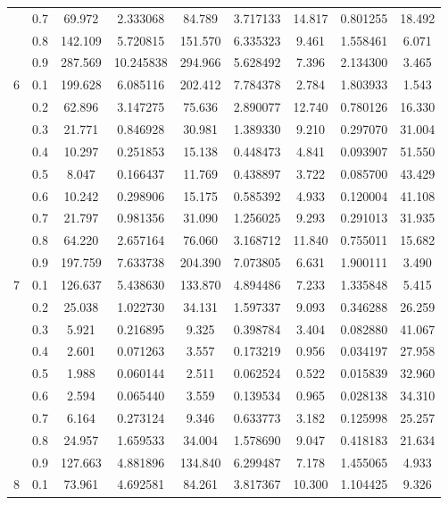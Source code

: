 \begin{longtable}{ | c | c || c | c | c | c | c | c | c | }
 & 0.7 & 69.972 & 2.333068 & 84.789 & 3.717133 & 14.817 & 0.801255 & 18.492 \\
 & 0.8 & 142.109 & 5.720815 & 151.570 & 6.335323 & 9.461 & 1.558461 & 6.071 \\
 & 0.9 & 287.569 & 10.245838 & 294.966 & 5.628492 & 7.396 & 2.134300 & 3.465 \\
 \hline
\multirow{9}{*}{6} & 0.1 & 199.628 & 6.085116 & 202.412 & 7.784378 & 2.784 & 1.803933 & 1.543 \\
 & 0.2 & 62.896 & 3.147275 & 75.636 & 2.890077 & 12.740 & 0.780126 & 16.330 \\
 & 0.3 & 21.771 & 0.846928 & 30.981 & 1.389330 & 9.210 & 0.297070 & 31.004 \\
 & 0.4 & 10.297 & 0.251853 & 15.138 & 0.448473 & 4.841 & 0.093907 & 51.550 \\
 & 0.5 & 8.047 & 0.166437 & 11.769 & 0.438897 & 3.722 & 0.085700 & 43.429 \\
 & 0.6 & 10.242 & 0.298906 & 15.175 & 0.585392 & 4.933 & 0.120004 & 41.108 \\
 & 0.7 & 21.797 & 0.981356 & 31.090 & 1.256025 & 9.293 & 0.291013 & 31.935 \\
 & 0.8 & 64.220 & 2.657164 & 76.060 & 3.168712 & 11.840 & 0.755011 & 15.682 \\
 & 0.9 & 197.759 & 7.633738 & 204.390 & 7.073805 & 6.631 & 1.900111 & 3.490 \\
 \hline
\multirow{9}{*}{7} & 0.1 & 126.637 & 5.438630 & 133.870 & 4.894486 & 7.233 & 1.335848 & 5.415 \\
 & 0.2 & 25.038 & 1.022730 & 34.131 & 1.597337 & 9.093 & 0.346288 & 26.259 \\
 & 0.3 & 5.921 & 0.216895 & 9.325 & 0.398784 & 3.404 & 0.082880 & 41.067 \\
 & 0.4 & 2.601 & 0.071263 & 3.557 & 0.173219 & 0.956 & 0.034197 & 27.958 \\
 & 0.5 & 1.988 & 0.060144 & 2.511 & 0.062524 & 0.522 & 0.015839 & 32.960 \\
 & 0.6 & 2.594 & 0.065440 & 3.559 & 0.139534 & 0.965 & 0.028138 & 34.310 \\
 & 0.7 & 6.164 & 0.273124 & 9.346 & 0.633773 & 3.182 & 0.125998 & 25.257 \\
 & 0.8 & 24.957 & 1.659533 & 34.004 & 1.578690 & 9.047 & 0.418183 & 21.634 \\
 & 0.9 & 127.663 & 4.881896 & 134.840 & 6.299487 & 7.178 & 1.455065 & 4.933 \\
 \hline
\multirow{9}{*}{8} & 0.1 & 73.961 & 4.692581 & 84.261 & 3.817367 & 10.300 & 1.104425 & 9.326 \\

\end{longtable}

